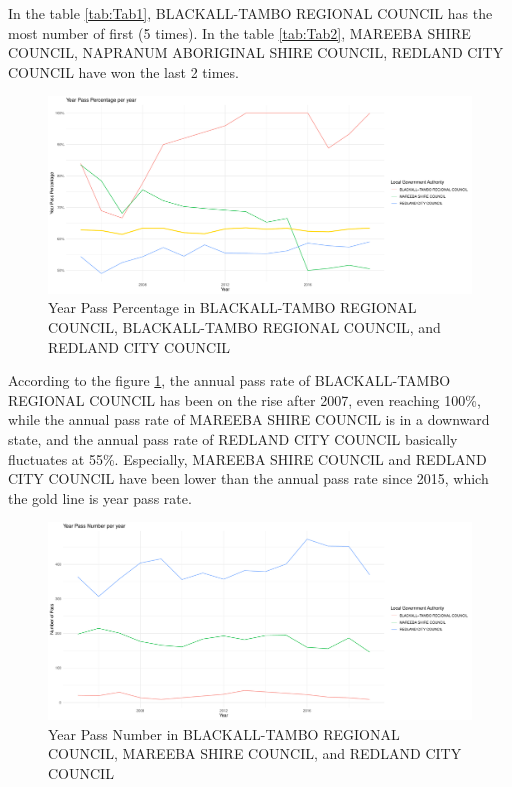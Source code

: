 \documentclass[11pt,a4paper,]{article}
\begin{document}
In the table \ref{tab:Tab1}, BLACKALL-TAMBO REGIONAL COUNCIL has the most number of first (5 times). In the table \ref{tab:Tab2}, MAREEBA SHIRE COUNCIL, NAPRANUM ABORIGINAL SHIRE COUNCIL, REDLAND CITY COUNCIL have won the last 2 times.

\begin{figure}

{\centering \includegraphics{Assignment4_files/figure-latex/Fig2-1} 

}

\caption{Year Pass Percentage in BLACKALL-TAMBO REGIONAL COUNCIL, BLACKALL-TAMBO REGIONAL COUNCIL, and REDLAND CITY COUNCIL}\label{fig:Fig2}
\end{figure}

According to the figure \ref{fig:Fig2}, the annual pass rate of BLACKALL-TAMBO REGIONAL COUNCIL has been on the rise after 2007, even reaching 100\%, while the annual pass rate of MAREEBA SHIRE COUNCIL is in a downward state, and the annual pass rate of REDLAND CITY COUNCIL basically fluctuates at 55\%. Especially, MAREEBA SHIRE COUNCIL and REDLAND CITY COUNCIL have been lower than the annual pass rate since 2015, which the gold line is year pass rate.

\begin{figure}

{\centering \includegraphics{Assignment4_files/figure-latex/Fig3-1} 

}

\caption{Year Pass Number in BLACKALL-TAMBO REGIONAL COUNCIL, MAREEBA SHIRE COUNCIL, and REDLAND CITY COUNCIL}\label{fig:Fig3}
\end{figure}
\end{document}
